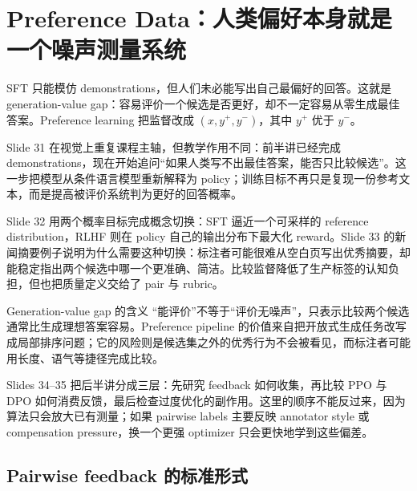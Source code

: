 \section{Preference Data：人类偏好本身就是一个噪声测量系统}

SFT 只能模仿 demonstrations，但人们未必能写出自己最偏好的回答。这就是 generation-value gap：容易评价一个候选是否更好，却不一定容易从零生成最佳答案。Preference learning 把监督改成 $(x,y^+,y^-)$，其中 $y^+$ 优于 $y^-$。


Slide 31 在视觉上重复课程主轴，但教学作用不同：前半讲已经完成 demonstrations，现在开始追问“如果人类写不出最佳答案，能否只比较候选”。这一步把模型从条件语言模型重新解释为 policy；训练目标不再只是复现一份参考文本，而是提高被评价系统判为更好的回答概率。


Slide 32 用两个概率目标完成概念切换：SFT 逼近一个可采样的 reference distribution，RLHF 则在 policy 自己的输出分布下最大化 reward。Slide 33 的新闻摘要例子说明为什么需要这种切换：标注者可能很难从空白页写出优秀摘要，却能稳定指出两个候选中哪一个更准确、简洁。比较监督降低了生产标签的认知负担，但也把质量定义交给了 pair 与 rubric。

\begin{importantbox}{Generation-value gap 的含义}
“能评价”不等于“评价无噪声”，只表示比较两个候选通常比生成理想答案容易。Preference pipeline 的价值来自把开放式生成任务改写成局部排序问题；它的风险则是候选集之外的优秀行为不会被看见，而标注者可能用长度、语气等捷径完成比较。
\end{importantbox}


Slides 34--35 把后半讲分成三层：先研究 feedback 如何收集，再比较 PPO 与 DPO 如何消费反馈，最后检查过度优化的副作用。这里的顺序不能反过来，因为算法只会放大已有测量；如果 pairwise labels 主要反映 annotator style 或 compensation pressure，换一个更强 optimizer 只会更快地学到这些偏差。

\subsection{Pairwise feedback 的标准形式}

